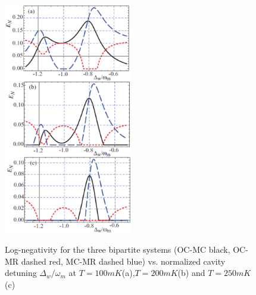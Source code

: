 \documentclass[a4paper,11pt, twocolumn]{article}
\numberwithin{equation}{section}
\begin{document}
\begin{figure}
 \caption{Log-negativity for the three bipartite systems (OC-MC black, OC-MR dashed red, MC-MR dashed blue) vs. normalized cavity detuning $\Delta_w/\omega_m$ at $T=100 mK$(a),$T=200 mK$(b) and $T=250 mK$(c)\cite{nanoMR}}
 \centering
   \includegraphics[width=0.5\textwidth]{figs/mr_entanglement}
 \label{fig:logneg}
\end{figure}
\end{document}
